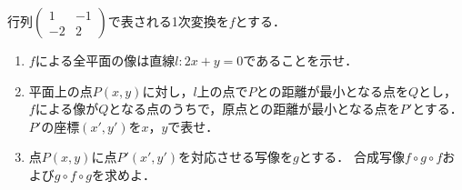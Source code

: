 \documentclass[../../main.tex]{subfiles}
\begin{document}
行列$
\begin{pmatrix} 1 & -1 \\ -2 & 2
\end{pmatrix}$で表される1次変換を$f$とする．
\begin{enumerate}
  \item $f$による全平面の像は直線$l:2x+y=0$であることを示せ．
  \item 平面上の点$P(x,y)$に対し，$l$上の点で$P$との距離が最小となる点を$Q$とし，
    $f$による像が$Q$となる点のうちで，原点との距離が最小となる点を$P'$とする．
    $P'$の座標$(x',y')$を$x$，$y$で表せ．
  \item 点$P(x,y)$に点$P'(x',y')$を対応させる写像を$g$とする．
    合成写像$f \circ g \circ f$および$g \circ f \circ g$を求めよ．
\end{enumerate}
\end{document}
